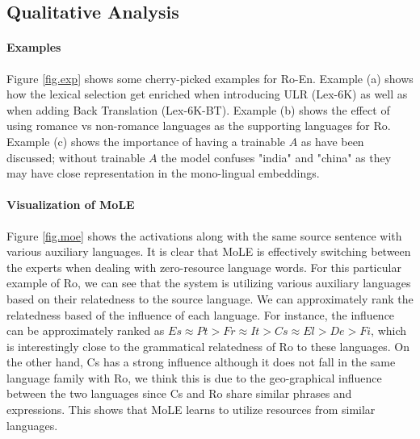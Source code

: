 

\subsection{Qualitative Analysis}
\paragraph{Examples} Figure \ref{fig.exp} shows some cherry-picked examples for Ro-En. Example (a) shows how the lexical selection get enriched when introducing ULR (Lex-6K) as well as when adding Back Translation (Lex-6K-BT). Example (b) shows the effect of using romance vs non-romance languages as the supporting languages for Ro. Example (c) shows the importance of having a trainable $A$ as have been discussed; without trainable $A$ the model confuses "india" and "china" as they may have  close representation in the mono-lingual embeddings.

\paragraph{Visualization of MoLE}
Figure \ref{fig.moe} shows the activations along with the same source sentence with various auxiliary languages. It is clear that MoLE is effectively switching between the  experts when dealing with  zero-resource language words. 
For this particular example of Ro, we can see that the system is utilizing  various auxiliary languages based on their relatedness to the source language. We can approximately rank the relatedness based of the influence of each language. For instance, the influence can be approximately ranked as $Es \approx Pt > Fr \approx It > Cs \approx El > De > Fi$, which is interestingly close to the  grammatical relatedness of Ro to these languages. On the other hand, Cs has a strong influence although it does not fall in the same language family with Ro, we think this is due to the geo-graphical influence between the two languages  since  Cs and Ro share similar phrases and expressions. This shows that MoLE learns to utilize resources from similar languages.



